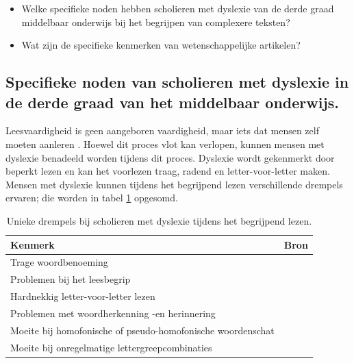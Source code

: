 \begin{itemize}
	\item Welke specifieke noden hebben scholieren met dyslexie van de derde graad middelbaar onderwijs bij het begrijpen van complexere teksten?
	\item Wat zijn de specifieke kenmerken van wetenschappelijke artikelen?
\end{itemize}

\subsection{Specifieke noden van scholieren met dyslexie in de derde graad van het middelbaar onderwijs.}

Leesvaardigheid is geen aangeboren vaardigheid, maar iets dat mensen zelf moeten aanleren \autocite{Bonte2020, VanDerMeer2022}. Hoewel dit proces vlot kan verlopen, kunnen mensen met dyslexie benadeeld worden tijdens dit proces.  Dyslexie wordt gekenmerkt door beperkt lezen en kan het voorlezen traag, radend en letter-voor-letter maken. Mensen met dyslexie kunnen tijdens het begrijpend lezen verschillende drempels ervaren; die worden in tabel \ref{table:dyslexia-hurdles} opgesomd.

\begin{center}
	\begin{table}[H]
	\begin{tabular}{ | m{9cm} | m{6cm} | } 
		\hline
		\textbf{Kenmerk} & \textbf{Bron} \\ 
		\hline
		Trage woordbenoeming &  \autocite{Bonte2020} \\
		\hline
		Problemen bij het leesbegrip & \autocite{Gala2016, Bonte2020} \\ 
		\hline
		Hardnekkig letter-voor-letter lezen & \autocite{Bonte2020, Zhang2021} \\ 
		\hline
		Problemen met woordherkenning -en herinnering & \autocite{Bonte2020} \\
		\hline
		Moeite bij homofonische of pseudo-homofonische woordenschat & \autocite{Zhang2021} \\
		\hline
		Moeite bij onregelmatige lettergreepcombinaties & \textcite{Gala2016} \\
		\hline
	\end{tabular}
	\caption{Unieke drempels bij scholieren met dyslexie tijdens het begrijpend lezen.}
	\label{table:dyslexia-hurdles}
	\end{table}
\end{center}

